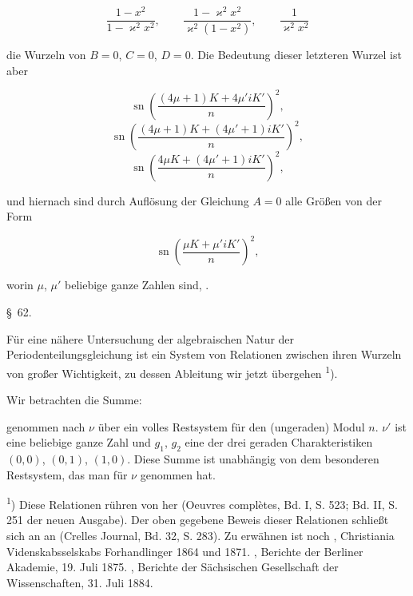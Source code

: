 
\[
\frac{1-x^2}{1-\varkappa^2 x^2}, \qquad \frac{1-\varkappa^2 x^2}{\varkappa^2(1-x^2)}, \qquad \frac{1}{\varkappa^2 x^2}
\]

die Wurzeln von $B = 0$, $C = 0$, $D = 0$. Die Bedeutung dieser
letzteren Wurzel ist aber %

\[
\operatorname{sn}\left(\frac{(4\mu+1)K + 4\mu' iK'}{n}\right)^2,
\]
\[
\operatorname{sn}\left(\frac{(4\mu+1)K + (4\mu'+1)iK'}{n}\right)^2,
\]
\[
\operatorname{sn}\left(\frac{4\mu K + (4\mu'+1)iK'}{n}\right)^2,
\]

und hiernach sind durch Auflösung der Gleichung $A = 0$ alle
Größen von der Form

\[
\operatorname{sn}\left(\frac{\mu K + \mu' iK'}{n}\right)^2,
\]

worin $\mu$, $\mu'$ beliebige ganze Zahlen sind, .

\begin{center}
\S\ 62. \quad {}
\end{center}

Für eine nähere Untersuchung der algebraischen Natur der
Periodenteilungsgleichung ist ein System von Relationen zwischen
ihren Wurzeln von großer Wichtigkeit, zu dessen Ableitung wir
jetzt übergehen \textsuperscript{1}).

Wir betrachten die Summe:


genommen nach $\nu$ über ein volles Restsystem für den (ungeraden)
Modul $n$. $\nu'$ ist eine beliebige ganze Zahl und $g_1$, $g_2$ eine der
drei geraden Charakteristiken $(0,0)$, $(0,1)$, $(1,0)$. Diese Summe
ist unabhängig von dem besonderen Restsystem, das man für $\nu$
genommen hat.

\begingroup
\footnotesize
\textsuperscript{1}) Diese Relationen rühren von  her (Oeuvres complètes, Bd. I,
S. 523; Bd. II, S. 251 der neuen Ausgabe). Der oben gegebene Beweis
dieser Relationen schließt sich an  an (Crelles Journal, Bd. 32,
S. 283). Zu erwähnen ist noch , Christiania Videnskabsselskabs
Forhandlinger 1864 und 1871. , Berichte der Berliner Akademie,
19. Juli 1875. , Berichte der Sächsischen Gesellschaft der Wissenschaften, 31. Juli 1884.
\endgroup
